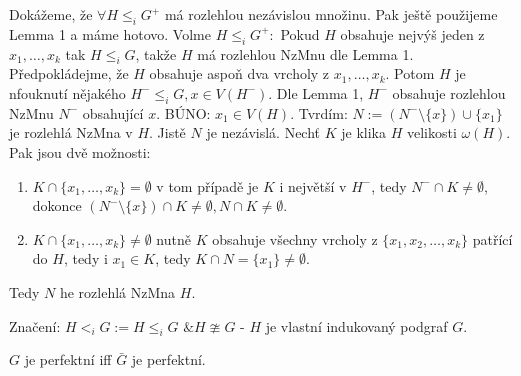 \begin{dukaz}
	Dokážeme, že $\forall H \leq_{i} G^{+}$ má rozlehlou nezávislou množinu. Pak ještě použijeme Lemma 1 a máme hotovo. Volme $H \leq_{i} G^{+}:$ Pokud $H$ obsahuje nejvýš jeden z $x_{1}, \dots, x_{k}$ tak $H \leq_{i} G$, takže $H$ má rozlehlou NzMnu dle Lemma 1. Předpokládejme, že $H$ obsahuje aspoň dva vrcholy z $x_{1}, \dots, x_{k}$. Potom $H$ je nfouknutí nějakého $H^{-} \leq_{i} G, x \in V(H^{-})$. Dle Lemma 1, $H^{-}$ obsahuje rozlehlou NzMnu $N^{-}$ obsahující $x$. BÚNO: $x_{1} \in V(H)$. Tvrdím: $N := (N^{-} \setminus \{x\}) \cup \{x_{1}\}$ je rozlehlá NzMna v $H$. Jistě $N$ je nezávislá. Nechť $K$ je klika $H$ velikosti $\omega(H)$. Pak jsou dvě možnosti:
	
	\begin{enumerate}
		\item $K \cap \{x_{1}, \dots, x_{k}\} = \emptyset$ v tom případě je $K$ i největší v $H^{-}$, tedy $N^{-} \cap K \neq \emptyset$, dokonce $(N^{-} \setminus \{x\}) \cap K \neq \emptyset, N \cap K \neq \emptyset$.
		\item $K \cap \{x_{1}, \dots, x_{k}\} \neq \emptyset$ nutně $K$ obsahuje všechny vrcholy z $\{x_{1}, x_{2}, \dots ,x_{k}\}$ patřící do $H$, tedy i $x_{1} \in K$, tedy $K \cap N = \{x_{1}\} \neq \emptyset$.
	\end{enumerate}
	
	Tedy $N$ he rozlehlá NzMna $H$.
\end{dukaz}

\begin{definice}
	Značení: $H <_{i} G := H \leq_{i} G \text{ \& } H \ncong G$ - $H$ je vlastní indukovaný podgraf $G$.
\end{definice}

\begin{veta}
	$G$ je perfektní iff $\bar{G}$ je perfektní.
\end{veta}

